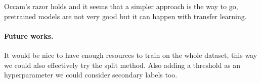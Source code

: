 \documentclass{article}
\begin{document}
Occam's razor holds and it seems that a simpler approach is the way to go, pretrained models are not very good but it can happen with transfer learning. 

\paragraph*{Future works.}
It would be nice to have enough resources to train on the whole dataset, this way we could also effectively try the split method.
Also adding a threshold as an hyperparameter we could consider secondary labels too.



\end{document}

